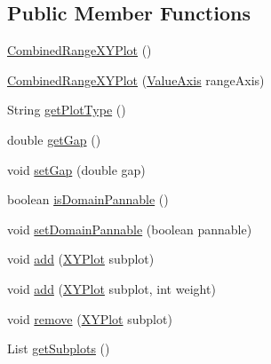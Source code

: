 \subsection*{Public Member Functions}
\begin{DoxyCompactItemize}
\item 
\mbox{\hyperlink{classorg_1_1jfree_1_1chart_1_1plot_1_1_combined_range_x_y_plot_a0f2d5d5092e64342187327b4cad562c2}{Combined\+Range\+X\+Y\+Plot}} ()
\item 
\mbox{\hyperlink{classorg_1_1jfree_1_1chart_1_1plot_1_1_combined_range_x_y_plot_abe63bba8b52ba79ceb63be1c0367ecb0}{Combined\+Range\+X\+Y\+Plot}} (\mbox{\hyperlink{classorg_1_1jfree_1_1chart_1_1axis_1_1_value_axis}{Value\+Axis}} range\+Axis)
\item 
String \mbox{\hyperlink{classorg_1_1jfree_1_1chart_1_1plot_1_1_combined_range_x_y_plot_a1c1935dd9b3b11c558a19242034bae5a}{get\+Plot\+Type}} ()
\item 
double \mbox{\hyperlink{classorg_1_1jfree_1_1chart_1_1plot_1_1_combined_range_x_y_plot_a8a2945d6449e0f4b02327dbae7239ae3}{get\+Gap}} ()
\item 
void \mbox{\hyperlink{classorg_1_1jfree_1_1chart_1_1plot_1_1_combined_range_x_y_plot_ab573b42e04de09b389acf8c17b31a3c2}{set\+Gap}} (double gap)
\item 
boolean \mbox{\hyperlink{classorg_1_1jfree_1_1chart_1_1plot_1_1_combined_range_x_y_plot_acc7049319fcef4aa176c61535cdef530}{is\+Domain\+Pannable}} ()
\item 
void \mbox{\hyperlink{classorg_1_1jfree_1_1chart_1_1plot_1_1_combined_range_x_y_plot_a38d02da74e74b3edceb78cb2fb76e41b}{set\+Domain\+Pannable}} (boolean pannable)
\item 
void \mbox{\hyperlink{classorg_1_1jfree_1_1chart_1_1plot_1_1_combined_range_x_y_plot_ab7baebaebc18ccd196e6402b651a5bcd}{add}} (\mbox{\hyperlink{classorg_1_1jfree_1_1chart_1_1plot_1_1_x_y_plot}{X\+Y\+Plot}} subplot)
\item 
void \mbox{\hyperlink{classorg_1_1jfree_1_1chart_1_1plot_1_1_combined_range_x_y_plot_a22097c8c6e52117556cfe45440fa75e1}{add}} (\mbox{\hyperlink{classorg_1_1jfree_1_1chart_1_1plot_1_1_x_y_plot}{X\+Y\+Plot}} subplot, int weight)
\item 
void \mbox{\hyperlink{classorg_1_1jfree_1_1chart_1_1plot_1_1_combined_range_x_y_plot_aa87e891ed2cfb05c8f9e876fe9b6366b}{remove}} (\mbox{\hyperlink{classorg_1_1jfree_1_1chart_1_1plot_1_1_x_y_plot}{X\+Y\+Plot}} subplot)
\item 
List \mbox{\hyperlink{classorg_1_1jfree_1_1chart_1_1plot_1_1_combined_range_x_y_plot_aa7e90a3d5824b905a8516de92ee0ca31}{get\+Subplots}} ()

\end{DoxyCompactItemize}
